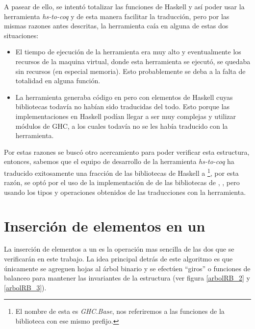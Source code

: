 A pasear de ello, se intent\'o totalizar las funciones de Haskell y así poder 
usar la herramienta \textit{hs-to-coq} y de esta manera facilitar la traducci\'on, pero por las 
mismas razones antes descritas, la herramienta caía en alguna de estas dos situaciones:

\begin{itemize}
    \item El tiempo de ejecuci\'on de la herramienta era muy alto y eventualmente los recursos de
    la maquina virtual, donde esta herramienta se ejecut\'o, se quedaba sin recursos (en
    especial memoria). Esto probablemente se deba a la falta de totalidad en alguna función.
    \item La herramienta generaba c\'odigo en {\coq} pero con elementos de Haskell cuyas bibliotecas
    todavía no habían sido traducidas del todo. Esto porque las implementaciones en Haskell pod\'ian
    llegar a ser muy complejas y utilizar módulos de GHC, a los cuales todav\'ia no se les hab\'ia
    traducido con la herramienta.
\end{itemize}{}

Por estas razones se busc\'o otro acercamiento para poder verificar esta estructura, entonces,
sabemos que el equipo de desarrollo de la herramienta \textit{hs-to-coq} ha traducido exitosamente 
una fracci\'on de las bibliotecas de Haskell a {\coq}\footnote{El nombre de esta es 
\textit{GHC.Base}, nos referiremos a las funciones de la biblioteca con ese mismo prefijo.}, por 
esta raz\'on, se opt\'o por el uso de la implementación de {\arns} de las bibliotecas de {\coq}, 
\cite{MSetRBT}, pero usando los tipos y operaciones obtenidos de las traducciones con la herramienta.

\section{Inserción de elementos en un {\arn}}

La inserci\'on de elementos a un {\arn} es la operaci\'on mas sencilla de las dos que se
verificar\'an en este trabajo. La idea principal detrás de este algoritmo es que \'unicamente se 
agreguen hojas al \'arbol binario y se efectúen ``giros'' o funciones de balanceo para 
mantener las invariantes de la estructura (ver figura \ref{arbolRB_2} y \ref{arbolRB_3}).

